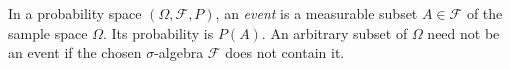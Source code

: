 
In a probability space $(\Omega,\mathcal F,P)$, an \emph{event} is a measurable subset $A\in\mathcal F$ of the sample space $\Omega$. Its probability is $P(A)$. An arbitrary subset of $\Omega$ need not be an event if the chosen $\sigma$-algebra $\mathcal F$ does not contain it.
